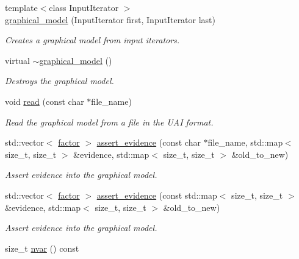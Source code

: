 \begin{DoxyCompactItemize}
{\footnotesize template$<$class Input\+Iterator $>$ }\\\hyperlink{classmerlin_1_1graphical__model_a337d8312dc3d7d8107ea6f7ea6ed435c}{graphical\+\_\+model} (Input\+Iterator first, Input\+Iterator last)
\begin{DoxyCompactList}\small\item\em Creates a graphical model from input iterators. \end{DoxyCompactList}\item 
\hypertarget{classmerlin_1_1graphical__model_a7eed9741a60c050ed1cc0b13602e0a3a}{}virtual \hyperlink{classmerlin_1_1graphical__model_a7eed9741a60c050ed1cc0b13602e0a3a}{$\sim$graphical\+\_\+model} ()\label{classmerlin_1_1graphical__model_a7eed9741a60c050ed1cc0b13602e0a3a}

\begin{DoxyCompactList}\small\item\em Destroys the graphical model. \end{DoxyCompactList}\item 
void \hyperlink{classmerlin_1_1graphical__model_ad67d810e65b40a32f5569d7f82cdfba5}{read} (const char $\ast$file\+\_\+name)
\begin{DoxyCompactList}\small\item\em Read the graphical model from a file in the U\+A\+I format. \end{DoxyCompactList}\item 
std\+::vector$<$ \hyperlink{classmerlin_1_1factor}{factor} $>$ \hyperlink{classmerlin_1_1graphical__model_a6edc6fc8040434b62ab2761805b02525}{assert\+\_\+evidence} (const char $\ast$file\+\_\+name, std\+::map$<$ size\+\_\+t, size\+\_\+t $>$ \&evidence, std\+::map$<$ size\+\_\+t, size\+\_\+t $>$ \&old\+\_\+to\+\_\+new)
\begin{DoxyCompactList}\small\item\em Assert evidence into the graphical model. \end{DoxyCompactList}\item 
std\+::vector$<$ \hyperlink{classmerlin_1_1factor}{factor} $>$ \hyperlink{classmerlin_1_1graphical__model_aa06bf7612a9c5827509504e85760df6e}{assert\+\_\+evidence} (const std\+::map$<$ size\+\_\+t, size\+\_\+t $>$ \&evidence, std\+::map$<$ size\+\_\+t, size\+\_\+t $>$ \&old\+\_\+to\+\_\+new)
\begin{DoxyCompactList}\small\item\em Assert evidence into the graphical model. \end{DoxyCompactList}\item 
\hypertarget{classmerlin_1_1graphical__model_af70ee4f7a4414fac4f7568e3c0e5efca}{}size\+\_\+t \hyperlink{classmerlin_1_1graphical__model_af70ee4f7a4414fac4f7568e3c0e5efca}{nvar} () const \label{classmerlin_1_1graphical__model_af70ee4f7a4414fac4f7568e3c0e5efca}


\end{DoxyCompactItemize}
